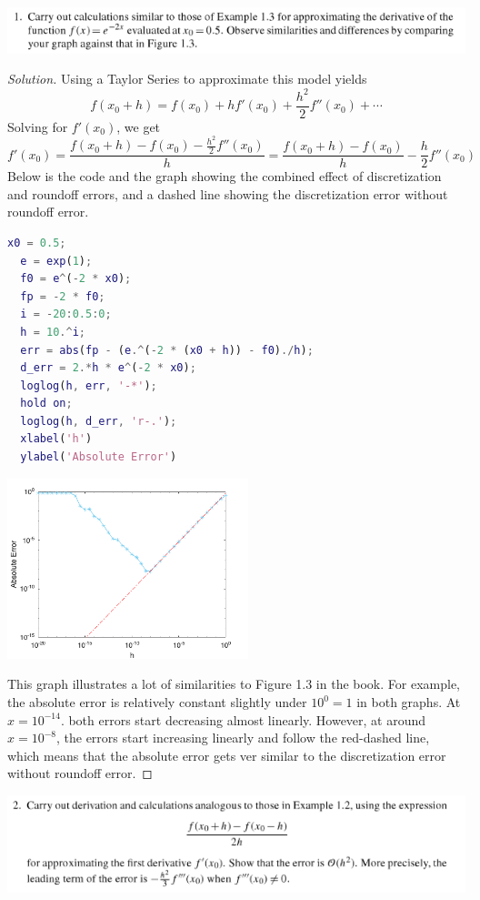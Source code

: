 \documentclass[12pt]{scrartcl}
\begin{document}
\includegraphics[width=15cm]{1.png}

\begin{proof}[Solution]
  Using a Taylor Series to approximate this model yields 
  \[f(x_0 + h) = f(x_0) + hf'(x_0) + \frac{h^2}{2}f''(x_0) + \cdots\]
  Solving for $f'(x_0)$, we get 
  \[f'(x_0) = \frac{f(x_0 + h) - f(x_0) - \frac{h^2}{2}f''(x_0)}{h} = \frac{f(x_0 + h) - f(x_0)}{h} - \frac{h}{2}f''(x_0)\]
  Below is the code and the graph showing the combined effect of discretization and roundoff errors, and a dashed line 
  showing the discretization error without roundoff error.

\begin{lstlisting}[language=Matlab]
  x0 = 0.5;
  e = exp(1);
  f0 = e^(-2 * x0);
  fp = -2 * f0;
  i = -20:0.5:0;
  h = 10.^i;
  err = abs(fp - (e.^(-2 * (x0 + h)) - f0)./h);
  d_err = 2.*h * e^(-2 * x0);
  loglog(h, err, '-*');
  hold on;
  loglog(h, d_err, 'r-.');
  xlabel('h')
  ylabel('Absolute Error')
\end{lstlisting}
\begin{center}
  \includegraphics[width=7cm]{g1.png}
\end{center}  

This graph illustrates a lot of similarities to Figure 1.3 in the book. For example, 
the absolute error is relatively constant slightly under $10^0 = 1$ in both graphs. 
At $x = 10^{-14}$. both errors start decreasing almost linearly. However, at around 
$x = 10^{-8}$, the errors start increasing linearly and follow the red-dashed line, 
which means that the absolute error gets ver similar to the discretization error without roundoff error.

\end{proof}

\includegraphics[width=15cm]{2.png}
\end{document}
